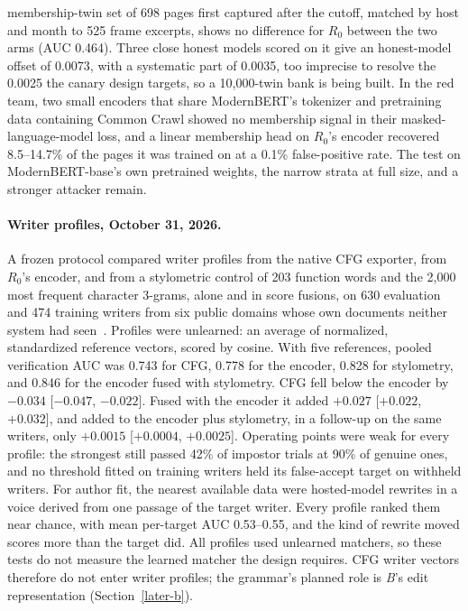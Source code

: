 membership-twin set of 698 pages first captured after the cutoff, matched by
host and month to 525 frame excerpts, shows no difference for \(R_0\) between
the two arms (AUC 0.464). Three close honest models scored on it give an
honest-model offset of 0.0073, with a systematic part of 0.0035, too imprecise
to resolve the 0.0025 the canary design targets, so a 10,000-twin bank is being
built. In the red team, two small encoders that share ModernBERT's tokenizer and
pretraining data containing Common Crawl showed no membership signal in their
masked-language-model loss, and a linear membership head on \(R_0\)'s encoder
recovered 8.5--14.7\% of the pages it was trained on at a 0.1\% false-positive
rate. The test on ModernBERT-base's own pretrained weights, the narrow strata at
full size, and a stronger attacker remain.

\paragraph{Writer profiles, October 31, 2026.}\label{writer-profile-evidence}
A frozen protocol compared writer profiles from the native CFG exporter, from
\(R_0\)'s encoder, and from a stylometric control of 203 function words and the
2,000 most frequent character 3-grams, alone and in score fusions, on 630
evaluation and 474 training writers from six public domains whose own documents
neither system had seen~\cite{cfgvsencoder}. Profiles were unlearned: an average
of normalized, standardized reference vectors, scored by cosine. With five
references, pooled verification AUC was 0.743 for CFG, 0.778 for the encoder,
0.828 for stylometry, and 0.846 for the encoder fused with stylometry. CFG fell
below the encoder by \(-0.034\) [\(-0.047\), \(-0.022\)]. Fused with the encoder
it added \(+0.027\) [\(+0.022\), \(+0.032\)], and added to the encoder plus
stylometry, in a follow-up on the same writers, only \(+0.0015\) [\(+0.0004\),
\(+0.0025\)]. Operating points were weak for every profile: the strongest still
passed 42\% of impostor trials at 90\% of genuine ones, and no threshold fitted
on training writers held its false-accept target on withheld writers. For author
fit, the nearest available data were hosted-model rewrites in a voice derived
from one passage of the target writer. Every profile ranked them near chance,
with mean per-target AUC 0.53--0.55, and the kind of rewrite moved scores more
than the target did. All profiles used unlearned matchers, so these tests do not
measure the learned matcher the design requires. CFG writer vectors therefore do
not enter writer profiles; the grammar's planned role is \textit{B}'s edit
representation (Section~\ref{later-b}).


